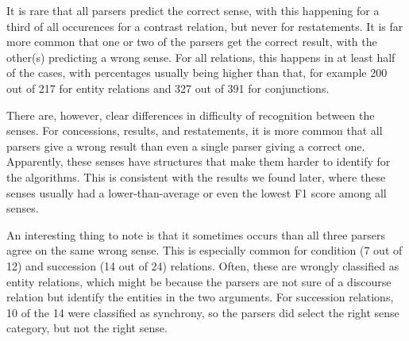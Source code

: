 \documentclass[10pt,notitlepage]{scrartcl}
\begin{document}
It is rare that all parsers predict the correct sense, with this happening for a third of all occurences for a contrast relation, but never for restatements. It is far more common that one or two of the parsers get the correct result, with the other(s) predicting a wrong sense. For all relations, this happens in at least half of the cases, with percentages usually being higher than that, for example 200 out of 217 for entity relations and 327 out of 391 for conjunctions.

There are, however, clear differences in difficulty of recognition between the senses. For concessions, results, and restatements, it is more common that all parsers give a wrong result than even a single parser giving a correct one. Apparently, these senses have structures that make them harder to identify for the algorithms. This is consistent with the results we found later, where these senses usually had a lower-than-average or even the lowest F1 score among all senses.

An interesting thing to note is that it sometimes occurs than all three parsers agree on the same wrong sense. This is especially common for condition (7 out of 12) and succession (14 out of 24) relations. Often, these are wrongly classified as entity relations, which might be because the parsers are not sure of a discourse relation but identify the entities in the two arguments. For succession relations, 10 of the 14 were classified as synchrony, so the parsers did select the right sense category, but not the right sense.
\end{document}
